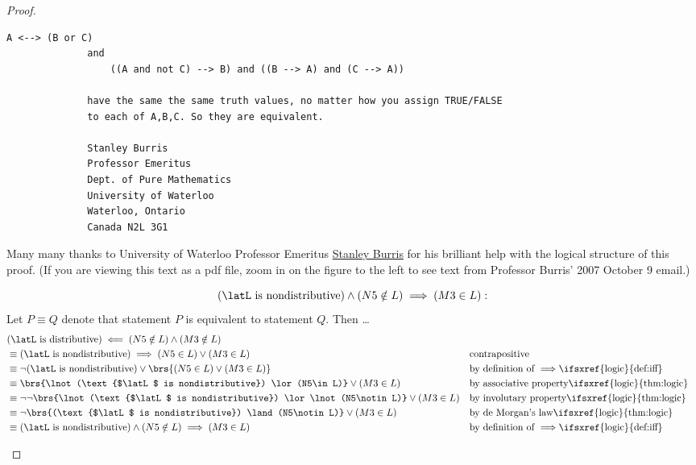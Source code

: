 \begin{proof}
\begin{enumerate}
\begin{enumerate}
{\begin{minipage}[t]{2\tw/16+1ex}
\begin{Verbatim}[frame=single, gobble=8, label={\footnotesize\rmfamily email}]
                  A <--> (B or C)
              and
                  ((A and not C) --> B) and ((B --> A) and (C --> A))

              have the same the same truth values, no matter how you assign TRUE/FALSE
              to each of A,B,C. So they are equivalent.

              Stanley Burris
              Professor Emeritus
              Dept. of Pure Mathematics
              University of Waterloo
              Waterloo, Ontario
              Canada N2L 3G1
            \end{Verbatim}
          \end{minipage}
          \hfill
          \begin{minipage}[t]{13\tw/16-3ex}
            Many many thanks to University of Waterloo Professor Emeritus
            \href{http://www.thoralf.uwaterloo.ca}{Stanley Burris}
            for his brilliant help with the logical structure of this proof.
            (If you are viewing this text as a pdf file,
             zoom in on the figure to the left to see text from Professor Burris' 2007 October 9 email.)
          \end{minipage}
        }
          \[ (\text{$\latL$ is nondistributive}) \land (N5\notin L) \implies (M3\in L): \]
        Let $P\equiv Q$ denote that statement $P$ is equivalent to statement $Q$. Then \ldots
        \begin{align*}
          &\text{($\latL$ is distributive)} \impliedby (N5\notin L) \land (M3\notin L)
          \\&\equiv \text{($\latL$ is nondistributive)} \implies (N5\in L) \lor (M3\in L)
            && \text{contrapositive}
          \\&\equiv \lnot(\text{$\latL$ is nondistributive}) \lor \brs{(N5\in L) \lor (M3\in L)}
            && \text{by definition of $\implies$\ifsxref{logic}{def:iff}}
          \\&\equiv \brs{\lnot(\text{$\latL$ is nondistributive}) \lor (N5\in L)} \lor (M3\in L)
            && \text{by associative property\ifsxref{logic}{thm:logic}}
          \\&\equiv \lnot\lnot\brs{\lnot(\text{$\latL$ is nondistributive}) \lor \lnot(N5\notin L)} \lor (M3\in L)
            && \text{by involutary property\ifsxref{logic}{thm:logic}}
          \\&\equiv \lnot\brs{(\text{$\latL$ is nondistributive}) \land (N5\notin L)} \lor (M3\in L)
            && \text{by de Morgan's law\ifsxref{logic}{thm:logic}}
          \\&\equiv (\text{$\latL$ is nondistributive}) \land (N5\notin L) \implies (M3\in L)
            && \text{by definition of $\implies$\ifsxref{logic}{def:iff}}
        \end{align*}


\end{enumerate}
\end{enumerate}
\end{proof}
